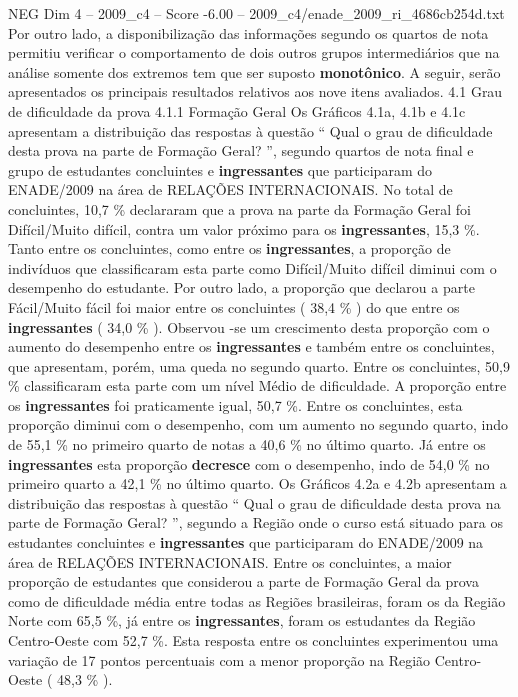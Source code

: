 \begin{textsample}{NEG Dim 4 – 2009\_c4 – Score -6.00 – 2009\_c4/enade\_2009\_ri\_4686cb254d.txt}
Por outro lado, a disponibilização das informações segundo os quartos de nota permitiu verificar o comportamento de dois outros grupos intermediários que na análise somente dos extremos tem que ser suposto \textbf{monotônico}.
A seguir, serão apresentados os principais resultados relativos aos nove itens avaliados. 4.1 Grau de dificuldade da prova 4.1.1 Formação Geral Os Gráficos 4.1a, 4.1b e 4.1c apresentam a distribuição das respostas à questão “ Qual o grau de dificuldade desta prova na parte de Formação Geral? ”, segundo quartos de nota final e grupo de estudantes concluintes e \textbf{ingressantes} que participaram do ENADE/2009 na área de RELAÇÕES INTERNACIONAIS.
No total de concluintes, 10,7 \% declararam que a prova na parte da Formação Geral foi Difícil/Muito difícil, contra um valor próximo para os \textbf{ingressantes}, 15,3 \%.
Tanto entre os concluintes, como entre os \textbf{ingressantes}, a proporção de indivíduos que classificaram esta parte como Difícil/Muito difícil diminui com o desempenho do estudante.
Por outro lado, a proporção que declarou a parte Fácil/Muito fácil foi maior entre os concluintes ( 38,4 \% ) do que entre os \textbf{ingressantes} ( 34,0 \% ).
Observou -se um crescimento desta proporção com o aumento do desempenho entre os \textbf{ingressantes} e também entre os concluintes, que apresentam, porém, uma queda no segundo quarto.
Entre os concluintes, 50,9 \% classificaram esta parte com um nível Médio de dificuldade.
A proporção entre os \textbf{ingressantes} foi praticamente igual, 50,7 \%.
Entre os concluintes, esta proporção diminui com o desempenho, com um aumento no segundo quarto, indo de 55,1 \% no primeiro quarto de notas a 40,6 \% no último quarto.
Já entre os \textbf{ingressantes} esta proporção \textbf{decresce} com o desempenho, indo de 54,0 \% no primeiro quarto a 42,1 \% no último quarto.
Os Gráficos 4.2a e 4.2b apresentam a distribuição das respostas à questão “ Qual o grau de dificuldade desta prova na parte de Formação Geral? ”, segundo a Região onde o curso está situado para os estudantes concluintes e \textbf{ingressantes} que participaram do ENADE/2009 na área de RELAÇÕES INTERNACIONAIS.
Entre os concluintes, a maior proporção de estudantes que considerou a parte de Formação Geral da prova como de dificuldade média entre todas as Regiões brasileiras, foram os da Região Norte com 65,5 \%, já entre os \textbf{ingressantes}, foram os estudantes da Região Centro-Oeste com 52,7 \%.
Esta resposta entre os concluintes experimentou uma variação de 17 pontos percentuais com a menor proporção na Região Centro-Oeste ( 48,3 \% ).

\end{textsample}
